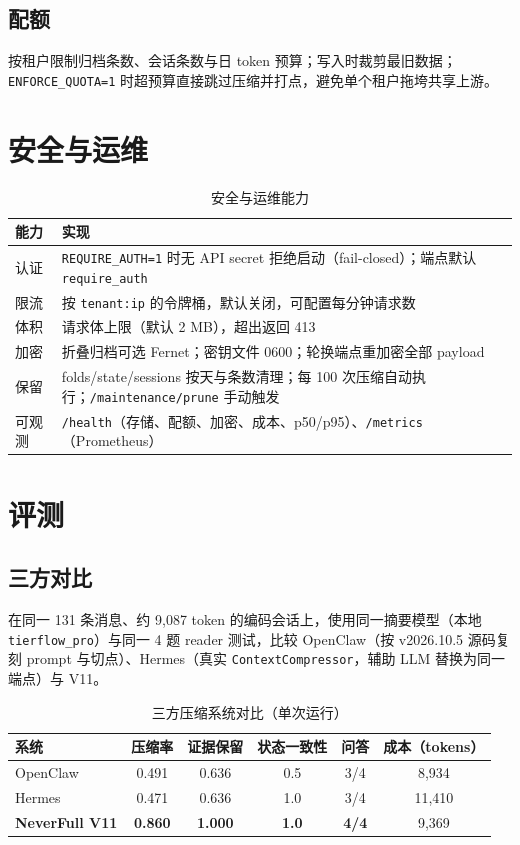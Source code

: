 \documentclass[11pt,a4paper]{ctexart}
\begin{document}
\subsection{配额}
按租户限制归档条数、会话条数与日 token 预算；写入时裁剪最旧数据；\texttt{ENFORCE\_QUOTA=1} 时超预算直接跳过压缩并打点，避免单个租户拖垮共享上游。

\section{安全与运维}

\begin{table}[htbp]
\centering
\caption{安全与运维能力}
\begin{tabularx}{\linewidth}{lX}
\toprule
能力 & 实现 \\
\midrule
认证 & \texttt{REQUIRE\_AUTH=1} 时无 API secret 拒绝启动（fail-closed）；端点默认 \texttt{require\_auth} \\
限流 & 按 \texttt{tenant:ip} 的令牌桶，默认关闭，可配置每分钟请求数 \\
体积 & 请求体上限（默认 2 MB），超出返回 413 \\
加密 & 折叠归档可选 Fernet；密钥文件 0600；轮换端点重加密全部 payload \\
保留 & folds/state/sessions 按天与条数清理；每 100 次压缩自动执行；\texttt{/maintenance/prune} 手动触发 \\
可观测 & \texttt{/health}（存储、配额、加密、成本、p50/p95）、\texttt{/metrics}（Prometheus） \\
\bottomrule
\end{tabularx}
\end{table}

\section{评测}

\subsection{三方对比}
在同一 131 条消息、约 9,087 token 的编码会话上，使用同一摘要模型（本地 \texttt{tierflow\_pro}）与同一 4 题 reader 测试，比较 OpenClaw（按 v2026.10.5 源码复刻 prompt 与切点）、Hermes（真实 \texttt{ContextCompressor}，辅助 LLM 替换为同一端点）与 V11。

\begin{table}[htbp]
\centering
\caption{三方压缩系统对比（单次运行）}
\begin{tabular}{lccccc}
\toprule
系统 & 压缩率 & 证据保留 & 状态一致性 & 问答 & 成本（tokens） \\
\midrule
OpenClaw & 0.491 & 0.636 & 0.5 & 3/4 & 8,934 \\
Hermes & 0.471 & 0.636 & 1.0 & 3/4 & 11,410 \\
\textbf{NeverFull V11} & \textbf{0.860} & \textbf{1.000} & \textbf{1.0} & \textbf{4/4} & 9,369 \\
\bottomrule
\end{tabular}
\end{table}
\end{document}
